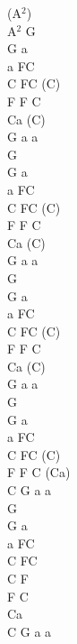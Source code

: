 \documentclass[a5paper, 10pt]{book}
\begin{document}
\begin{minipage}[t]{0.3\textwidth}
  (A$^2$)\\
  A$^2$ G \\
  G a\\
  a FC\\
  C FC (C)\\
  F F C\\
  Ca (C)\\
  G a a\\

  G \\
  G a\\
  a FC\\
  C FC (C)\\
  F F C\\
  Ca (C)\\
  G a a\\

  G \\
  G a\\
  a FC\\
  C FC (C)\\
  F F C\\
  Ca (C)\\
  G a a\\

  G \\
  G a\\
  a FC\\
  C FC (C)\\
  F F C (Ca)\\
  C G a a\\

  G \\
  G a\\
  a FC\\
  C FC\\
  C F\\
  F C\\
  Ca\\
  C G a a\\

\end{minipage}

\newpage
\end{document}
